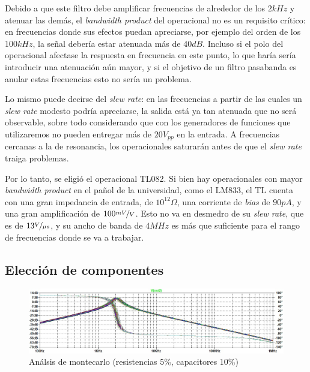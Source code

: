 \documentclass[../../tc_tp3_main.tex]{subfiles}
\begin{document}
Debido a que este filtro debe amplificar frecuencias de alrededor de los $2kHz$ y atenuar las dem\'as, el \textit{bandwidth product} del operacional no es un requisito cr\'itico: en frecuencias donde sus efectos puedan apreciarse, por ejemplo del orden de los $100kHz$, la se\~nal deber\'ia estar atenuada m\'as de $40dB$. Incluso si el polo del operacional afectase la respuesta en frecuencia en este punto, lo que har\'ia ser\'ia introducir una atenuaci\'on a\'un mayor, y si el objetivo de un filtro pasabanda es anular estas frecuencias esto no ser\'ia un problema. \par 

Lo mismo puede decirse del \textit{slew rate}: en las frecuencias a partir de las cuales un \textit{slew rate} modesto podr\'ia apreciarse, la salida est\'a ya tan atenuada que no ser\'a observable, sobre todo considerando que con los generadores de funciones que utilizaremos no pueden entregar m\'as de $20V_{pp}$ en la entrada. A frecuencias cercanas a la de resonancia, los operacionales saturar\'an antes de que el \textit{slew rate} traiga problemas.\par

Por lo tanto, se eligi\'o el operacional TL082. Si bien hay operacionales con mayor \textit{bandwidth product} en el pa\~nol de la universidad, como el LM833, el TL cuenta con una gran impedancia de entrada, de $10^{12}\Omega$, una corriente de \textit{bias} de $90pA$, y una gran amplificaci\'on de $100\nicefrac{mV}{V}$. Esto no va en desmedro de su \textit{slew rate}, que es de $13\nicefrac{V}{\mu s}$, y su ancho de banda de $4MHz$ es m\'as que suficiente para el rango de frecuencias donde se va a trabajar.


\subsection{Elecci\'on de componentes}

\begin{figure}[H]
  \includegraphics[scale = 0.7]{imagenes/ej1-montecarlo.jpg}
  \caption{An\'alsis de montecarlo (resistencias 5\%, capacitores 10\%)}
  \label{fig:1-montecarlo}
\end{figure}
\end{document}
